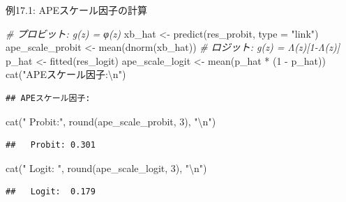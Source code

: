 \documentclass[
  ignorenonframetext,
]{beamer}
\newenvironment{Shaded}{\begin{snugshade}}{\end{snugshade}}
\newcommand{\AttributeTok}[1]{\textcolor[rgb]{0.77,0.63,0.00}{#1}}
\newcommand{\CommentTok}[1]{\textcolor[rgb]{0.56,0.35,0.01}{\textit{#1}}}
\newcommand{\DecValTok}[1]{\textcolor[rgb]{0.00,0.00,0.81}{#1}}
\newcommand{\FunctionTok}[1]{\textcolor[rgb]{0.00,0.00,0.00}{#1}}
\newcommand{\NormalTok}[1]{#1}
\newcommand{\OtherTok}[1]{\textcolor[rgb]{0.56,0.35,0.01}{#1}}
\newcommand{\SpecialCharTok}[1]{\textcolor[rgb]{0.00,0.00,0.00}{#1}}
\newcommand{\StringTok}[1]{\textcolor[rgb]{0.31,0.60,0.02}{#1}}
\begin{document}
\begin{frame}[fragile]{例17.1: APEスケール因子の計算}
\protect\hypertarget{ux4f8b17.1-apeux30b9ux30b1ux30fcux30ebux56e0ux5b50ux306eux8a08ux7b97}{}
\footnotesize

\begin{Shaded}
\begin{Highlighting}[]
\CommentTok{\# プロビット: g(z) = φ(z)}
\NormalTok{xb\_hat }\OtherTok{\textless{}{-}} \FunctionTok{predict}\NormalTok{(res\_probit, }\AttributeTok{type =} \StringTok{"link"}\NormalTok{)}
\NormalTok{ape\_scale\_probit }\OtherTok{\textless{}{-}} \FunctionTok{mean}\NormalTok{(}\FunctionTok{dnorm}\NormalTok{(xb\_hat))}
\CommentTok{\# ロジット: g(z) = Λ(z)[1{-}Λ(z)]}
\NormalTok{p\_hat }\OtherTok{\textless{}{-}} \FunctionTok{fitted}\NormalTok{(res\_logit)}
\NormalTok{ape\_scale\_logit }\OtherTok{\textless{}{-}} \FunctionTok{mean}\NormalTok{(p\_hat }\SpecialCharTok{*}\NormalTok{ (}\DecValTok{1} \SpecialCharTok{{-}}\NormalTok{ p\_hat))}
\FunctionTok{cat}\NormalTok{(}\StringTok{"APEスケール因子:}\SpecialCharTok{\textbackslash{}n}\StringTok{"}\NormalTok{)}
\end{Highlighting}
\end{Shaded}

\begin{verbatim}
## APEスケール因子:
\end{verbatim}

\begin{Shaded}
\begin{Highlighting}[]
\FunctionTok{cat}\NormalTok{(}\StringTok{"  Probit:"}\NormalTok{, }\FunctionTok{round}\NormalTok{(ape\_scale\_probit, }\DecValTok{3}\NormalTok{), }\StringTok{"}\SpecialCharTok{\textbackslash{}n}\StringTok{"}\NormalTok{)}
\end{Highlighting}
\end{Shaded}

\begin{verbatim}
##   Probit: 0.301
\end{verbatim}

\begin{Shaded}
\begin{Highlighting}[]
\FunctionTok{cat}\NormalTok{(}\StringTok{"  Logit: "}\NormalTok{, }\FunctionTok{round}\NormalTok{(ape\_scale\_logit,  }\DecValTok{3}\NormalTok{), }\StringTok{"}\SpecialCharTok{\textbackslash{}n}\StringTok{"}\NormalTok{)}
\end{Highlighting}
\end{Shaded}

\begin{verbatim}
##   Logit:  0.179
\end{verbatim}

\normalsize
\end{frame}
\end{document}
